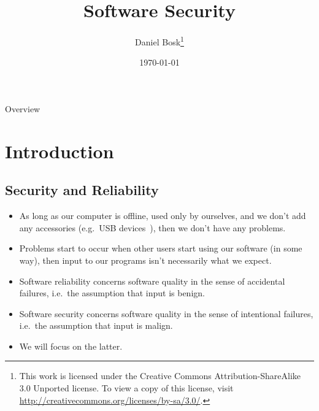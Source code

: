\documentclass{beamer}
\title{%
  Software Security
}
\author{Daniel Bosk\footnote{%
  This work is licensed under the Creative Commons Attribution-ShareAlike 3.0 
  Unported license.
	To view a copy of this license, visit 
	\url{http://creativecommons.org/licenses/by-sa/3.0/}.
}}
\institute[MIUN IKS]{%
  Department of Information and Communication Systems,\\
  Mid Sweden University, SE-851\,70 Sundsvall
}
\date{\today}
\begin{document}
\begin{frame}
  \titlepage
\end{frame}

\begin{frame}{Overview}
  \begin{multicols}{2}
    \tableofcontents
  \end{multicols}
\end{frame}





\section{Introduction}

\subsection{Security and Reliability}

\begin{frame}{\insertsubsectionhead}
  \begin{itemize}
    \item As long as our computer is offline, used only by ourselves, and we 
      don't add any accessories (e.g.\ USB devices~\cite{ieeespectrum2014usb}), 
      then we don't have any problems.

    \item Problems start to occur when other users start using our software (in 
      some way), then input to our programs isn't necessarily what we expect.

  \end{itemize}
\end{frame}

\begin{frame}{\insertsubsectionhead}
  \begin{itemize}
    \item Software reliability concerns software quality in the sense of 
      accidental failures, i.e.\ the assumption that input is benign.

    \item Software security concerns software quality in the sense of 
      intentional failures, i.e.\ the assumption that input is malign.

    \item We will focus on the latter.

  \end{itemize}
\end{frame}
\end{document}
